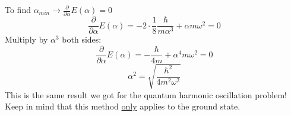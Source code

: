 To find $\alpha_{min}\rightarrow\frac{\partial}{\partial \alpha}E(\alpha)=0$
\[
\frac{\partial}{\partial \alpha}E(\alpha)=-2\cdot\frac{1}{8}\frac{\hbar}{m\alpha^{3}}+\alpha m\omega^2=0
\]
Multiply by $\alpha^3$ both sides:
\[
\frac{\partial}{\partial \alpha}E(\alpha)=-\frac{\hbar}{4m}+\alpha^4m\omega^2=0
\]
\[
\alpha^2=\sqrt{\frac{\hbar^2}{4m^2\omega^2}}
\]
This is the same result we got for the quantum harmonic oscillation problem! Keep in mind that this method \underline{only} applies to the ground state.
